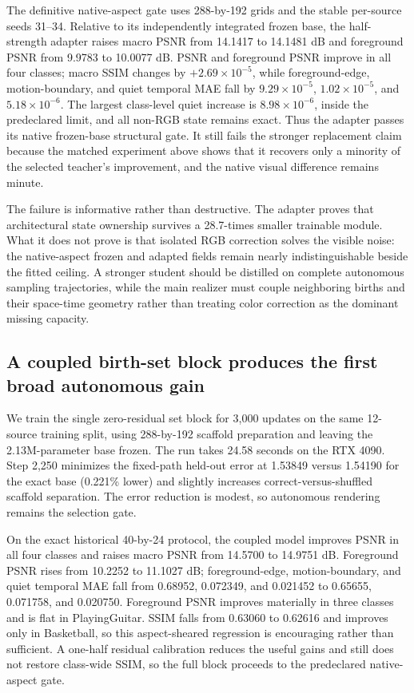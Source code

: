 \documentclass[10pt]{article}
\begin{document}
The definitive native-aspect gate uses 288-by-192 grids and the stable per-source seeds
31--34. Relative to its independently integrated frozen base, the half-strength adapter raises
macro PSNR from 14.1417 to 14.1481 dB and foreground PSNR from 9.9783 to 10.0077 dB. PSNR and
foreground PSNR improve in all four classes; macro SSIM changes by $+2.69\times10^{-5}$, while
foreground-edge, motion-boundary, and quiet temporal MAE fall by $9.29\times10^{-5}$,
$1.02\times10^{-5}$, and $5.18\times10^{-6}$. The largest class-level quiet increase is
$8.98\times10^{-6}$, inside the predeclared limit, and all non-RGB state remains exact. Thus the
adapter passes its native frozen-base structural gate. It still fails the stronger replacement
claim because the matched experiment above shows that it recovers only a minority of the selected
teacher's improvement, and the native visual difference remains minute.

The failure is informative rather than destructive. The adapter proves that architectural state
ownership survives a 28.7-times smaller trainable module. What it does not prove is that isolated
RGB correction solves the visible noise: the native-aspect frozen and adapted fields remain nearly
indistinguishable beside the fitted ceiling. A stronger student should be distilled on complete
autonomous sampling trajectories, while the main realizer must couple neighboring births and their
space-time geometry rather than treating color correction as the dominant missing capacity.

\subsection{A coupled birth-set block produces the first broad autonomous gain}

We train the single zero-residual set block for 3,000 updates on the same 12-source training split,
using 288-by-192 scaffold preparation and leaving the 2.13M-parameter base frozen. The run takes
24.58 seconds on the RTX 4090. Step 2,250 minimizes the fixed-path held-out error at 1.53849 versus
1.54190 for the exact base (0.221\% lower) and slightly increases correct-versus-shuffled scaffold
separation. The error reduction is modest, so autonomous rendering remains the selection gate.

On the exact historical 40-by-24 protocol, the coupled model improves PSNR in all four classes and
raises macro PSNR from 14.5700 to 14.9751 dB. Foreground PSNR rises from 10.2252 to 11.1027 dB;
foreground-edge, motion-boundary, and quiet temporal MAE fall from 0.68952, 0.072349, and 0.021452
to 0.65655, 0.071758, and 0.020750. Foreground PSNR improves materially in three classes and is
flat in PlayingGuitar. SSIM falls from 0.63060 to 0.62616 and improves only in Basketball, so this
aspect-sheared regression is encouraging rather than sufficient. A one-half residual calibration
reduces the useful gains and still does not restore class-wide SSIM, so the full block proceeds to
the predeclared native-aspect gate.
\end{document}

